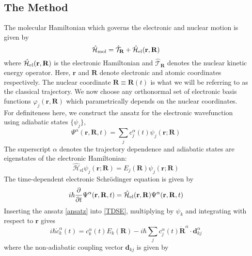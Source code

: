 \subsection{The Method}
    The molecular Hamiltonian which governs the electronic and nuclear motion is given by
    \begin{equation}
        \Hat{\mathcal{H}}_{\text{mol}} = \hat{\mathcal{T}}_{\mathbf{R}} + \Hat{\mathcal{H}}_{\text{el}}(\mathbf{r},\mathbf{R})
    \end{equation}
    where $\Hat{\mathcal{H}}_{\text{el}}(\mathbf{r},\mathbf{R})$ is the electronic Hamiltonian and $\hat{\mathcal{T}}_{\mathbf{R}}$ denotes the nuclear kinetic energy operator. Here, $\mathbf{r}$ and $\mathbf{R}$ denote electronic and atomic coordinates respectively. The nuclear coordinate $\mathbf{R} \equiv \mathbf{R}(t)$ is what we will be referring to as the classical trajectory. We now choose any orthonormal set of electronic basis functions $\varphi_j(\mathbf{r},\mathbf{R})$  which parametrically depends on the nuclear coordinates. For definiteness here, we construct the ansatz for the electronic wavefunction using adiabatic states $\{\psi_j\}$,
    \begin{equation}\label{ansatz}
        \Psi^\alpha(\mathbf{r},\mathbf{R},t) = \sum_j c^\alpha_j(t) \psi_j(\mathbf{r};\mathbf{R})
    \end{equation}
    The superscript $\alpha$ denotes the trajectory dependence and adiabatic states are eigenstates of the electronic Hamiltonian:
    \begin{equation}
        \hat{\mathcal{H}}_{\text{el}}\psi_j(\mathbf{r};\mathbf{R}) = E_j(\mathbf{R})\psi_j(\mathbf{r};\mathbf{R})
    \end{equation}
    The time-dependent electronic Schr{\"o}dinger equation is given by
    \begin{equation}\label{TDSE}
        i\hbar\frac{\partial}{\partial t}\Psi^\alpha(\mathbf{r},\mathbf{R},t) = \Hat{\mathcal{H}}_{\text{el}}(\mathbf{r},\mathbf{R})\Psi^\alpha(\mathbf{r},\mathbf{R},t) 
    \end{equation}
     Inserting the ansatz \eqref{ansatz} into \eqref{TDSE}, multiplying by $\psi_k$ and integrating with respect to $\mathbf{r}$ gives
     \begin{equation}\label{cdot}
         i\hbar \Dot{c}_k^\alpha(t) = c_k^\alpha(t)E_k(\mathbf{R}) - i\hbar\sum_j c_j^\alpha(t)\Dot{\mathbf{R}}^\alpha\cdot\mathbf{d}^\alpha_{kj} 
     \end{equation}
     where the non-adiabatic coupling vector $\mathbf{d}_{kj}$ is given by

